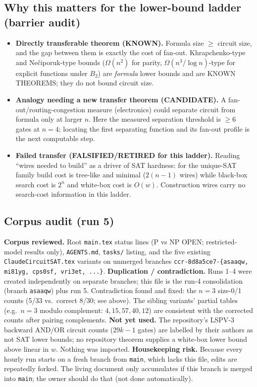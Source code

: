 \documentclass[11pt]{article}
\newcommand{\OPEN}{OPEN}
\begin{document}
\subsection{Why this matters for the lower-bound ladder (barrier audit)}
\begin{itemize}
\item \textbf{Directly transferable theorem (KNOWN).} Formula size $\ge$ circuit size, and the gap between them is exactly the cost of fan-out. Khrapchenko-type and Ne\v{c}iporuk-type bounds ($\Omega(n^2)$ for parity, $\Omega(n^3/\log n)$-type for explicit functions under $B_2$) are \emph{formula} lower bounds and are KNOWN THEOREMS; they do not bound circuit size.
\item \textbf{Analogy needing a new transfer theorem (CANDIDATE).} A fan-out/routing-congestion measure (electronics) could separate circuit from formula only at larger $n$. Here the measured separation threshold is $\ge6$ gates at $n=4$; locating the first separating function and its fan-out profile is the next computable step.
\item \textbf{Failed transfer (FALSIFIED/RETIRED for this ladder).} Reading ``wires needed to build'' as a driver of SAT hardness: for the unique-SAT family build cost is tree-like and minimal ($2(n-1)$ wires) while black-box search cost is $2^n$ and white-box cost is $O(w)$. Construction wires carry no search-cost information in this ladder.
\end{itemize}

\subsection{Corpus audit (run 5)}
\textbf{Corpus reviewed.} Root \texttt{main.tex} status lines (P vs NP \OPEN; restricted-model results only), \texttt{AGENTS.md}, \texttt{tasks/} listing, and the five existing \texttt{ClaudeCircuitSAT.tex} variants on unmerged branches \texttt{ccr-8d8a5ce7-\{asaaqw, mi81yg, cps0sf, vri3et, ...\}}.
\textbf{Duplication / contradiction.} Runs 1--4 were created independently on separate branches; this file is the run-4 consolidation (branch \texttt{asaaqw}) plus run 5. Contradiction found and fixed: the $n=3$ size-0/1 counts (5/33 vs.\ correct 8/30; see above). The sibling variants' partial tables (e.g.\ $n=3$ modulo complement: $4,15,57,40,12$) are consistent with the corrected counts after pairing complements.
\textbf{Not yet used.} The repository's LSPV-3 backward AND/OR circuit counts ($29k-1$ gates) are labelled by their authors as not SAT lower bounds; no repository theorem supplies a white-box lower bound above linear in $w$. Nothing was imported.
\textbf{Housekeeping risk.} Because every hourly run starts on a fresh branch from \texttt{main}, which lacks this file, edits are repeatedly forked. The living document only accumulates if this branch is merged into \texttt{main}; the owner should do that (not done automatically).
\end{document}
